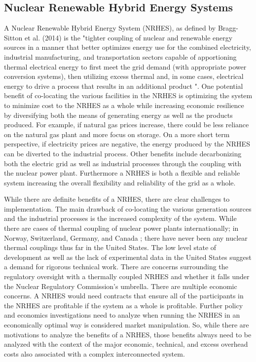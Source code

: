 \documentclass{article}                                                                           %
\begin{document}
\begin{linenumbers}
\subsection{Nuclear Renewable Hybrid Energy Systems}

A Nuclear Renewable Hybrid Energy System (NRHES), as defined by Bragg-Sitton et al. (2014) is the "tighter coupling of nuclear and renewable energy sources in a manner that better optimizes energy use for the combined electricity, industrial manufacturing, and transportation sectors capable of apportioning thermal electrical energy to first meet the grid demand (with appropriate power conversion systems), then utilizing excess thermal and, in some cases, electrical energy to drive a process that results in an additional product \cite {Bragg-Sitton2014}".  One potential benefit of co-locating the various facilities in the NRHES is optimizing the system to minimize cost to the NRHES as a whole while increasing economic resilience by diversifying both the means of generating energy as well as the products produced. For example, if natural gas prices increase, there could be less reliance on the natural gas plant and more focus on storage.  On a more short term perspective, if electricity prices are negative, the energy produced by the NRHES can be diverted to the industrial process. Other benefits include decarbonizing both the electric grid as well as industrial processes through the coupling with the nuclear power plant. Furthermore a NRHES is both a flexible and reliable system increasing the overall flexibility and reliability of the grid as a whole.

While there are definite benefits of a NRHES, there are clear challenges to implementation. The main drawback of co-locating the various generation sources and the industrial processes is the increased complexity of the system.  While there are cases of thermal coupling of nuclear power plants internationally; in Norway, Switzerland, Germany, and Canada \cite{Verfondern};  there have never been any nuclear thermal couplings thus far in the United States.  The low level state of development as well as the lack of experimental data in the United States suggest a demand for rigorous technical work.  There are concerns surrounding the regulatory oversight with a thermally coupled NRHES and whether it falls under the Nuclear Regulatory Commission's umbrella. There are multiple economic concerns. A NRHES would need contracts that ensure all of the participants in the NRHES are profitable if the system as a whole is profitable. Further policy and economics investigations need to analyze when running the NRHES in an economically optimal way is considered market manipulation. So, while there are motivations to analyze the benefits of a NRHES, those benefits always need to be analyzed with the context of the major economic, technical, and excess overhead costs also associated with a complex interconnected system.


\end{linenumbers}
\end{document}
